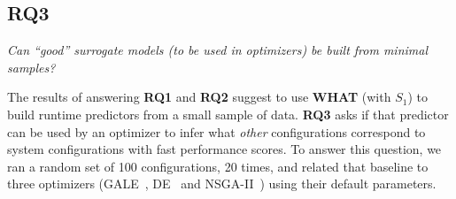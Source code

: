 \documentclass{newsig}
\newcommand{\what}{{\bf WHAT }}
\begin{document}
\subsection{RQ3}

\begin{center}
{\em
Can ``good'' surrogate models (to be used in optimizers)
be built from minimal samples?}
\end{center}

The results of answering {\bf RQ1} and {\bf RQ2} suggest to use \what (with $S_1$) to build runtime predictors from a small sample of  data. {\bf RQ3}
asks if that predictor can be used by an optimizer to infer what {\em other} configurations correspond to system configurations with fast performance scores.
To answer this question,  we ran  a random set of 100 
configurations, 20 times, and related that baseline to three optimizers (GALE~\cite{krall2014gale}, DE~\cite{storn1997differential} and  NSGA-II~\cite{deb00afast}) using their
default parameters.
\end{document}
